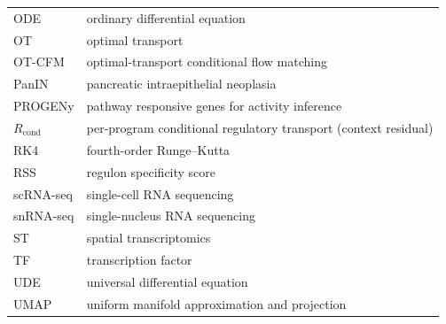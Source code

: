 \begin{singlespace}
\begin{longtable}{@{}p{}p{}@{}}
ODE & ordinary differential equation \\
OT & optimal transport \\
OT-CFM & optimal-transport conditional flow matching \\
PanIN & pancreatic intraepithelial neoplasia \\
PROGENy & pathway responsive genes for activity inference \\
$R_{\mathrm{cond}}$ & per-program conditional regulatory transport (context residual) \\
RK4 & fourth-order Runge--Kutta \\
RSS & regulon specificity score \\
scRNA-seq & single-cell RNA sequencing \\
snRNA-seq & single-nucleus RNA sequencing \\
ST & spatial transcriptomics \\
TF & transcription factor \\
UDE & universal differential equation \\
UMAP & uniform manifold approximation and projection \\
\end{longtable}
\end{singlespace}

